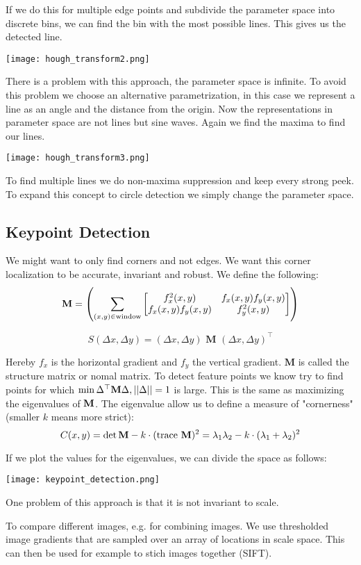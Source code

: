 If we do this for multiple edge points and subdivide the parameter space into discrete bins, we can find the bin with the most possible lines. This gives us the detected line.
\begin{center}
	\texttt{[image: hough\_transform2.png]}
\end{center}

There is a problem with this approach, the parameter space is infinite. To avoid this problem we choose an alternative parametrization, in this case we represent a line as an angle and the distance from the origin. Now the representations in parameter space are not lines but sine waves. Again we find the maxima to find our lines.
\begin{center}
	\texttt{[image: hough\_transform3.png]}
\end{center}

To find multiple lines we do non-maxima suppression and keep every strong peek. To expand this concept to circle detection we simply change the parameter space.


\subsection{Keypoint Detection}

We might want to only find corners and not edges. We want this corner localization to be accurate, invariant and robust. We define the following:
$$\textbf M = \left( \sum_{(x,y) \in \text{window}} 
\begin{bmatrix}
    f_x^2(x,y) & f_x(x,y) f_y(x,y) \\
    f_x(x,y) f_y(x,y) & f_y^2(x,y)
\end{bmatrix}
\right)$$

$$S(\Delta x, \Delta y) = (\Delta x, \Delta y) \textbf{ M } (\Delta x, \Delta y)^\top$$

Hereby $f_x$ is the horizontal gradient and $f_y$ the vertical gradient. $\textbf{M}$ is called the structure matrix or nomal matrix. To detect feature points we know try to find points for which $\min \Delta^\top \textbf M \Delta, || \Delta || = 1 $ is large. This is the same as maximizing the eigenvalues of $\textbf M$. The eigenvalue allow us to define a measure of "cornerness" (smaller $k$ means more strict):
$$C(x,y) = \det \textbf M - k \cdot (\text{trace } \textbf M)^2 = \lambda_1 \lambda_2 - k \cdot (\lambda_1 + \lambda_2)^2$$

If we plot the values for the eigenvalues, we can divide the space as follows:
\begin{center}
	\texttt{[image: keypoint\_detection.png]}
\end{center}

One problem of this approach is that it is not invariant to scale. \medskip

To compare different images, e.g. for combining images. We use thresholded image gradients that are sampled over an array of locations in scale space. This can then be used for example to stich images together (SIFT).






